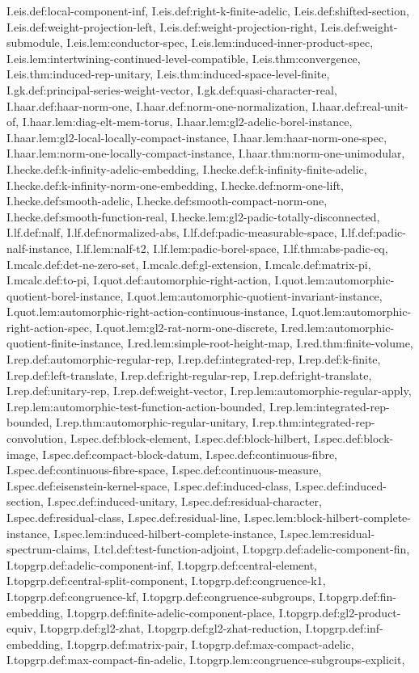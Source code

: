 \begin{theorem}
I.eis.def:local-component-inf, I.eis.def:right-k-finite-adelic, I.eis.def:shifted-section, I.eis.def:weight-projection-left, I.eis.def:weight-projection-right, I.eis.def:weight-submodule, I.eis.lem:conductor-spec, I.eis.lem:induced-inner-product-spec, I.eis.lem:intertwining-continued-level-compatible, I.eis.thm:convergence, I.eis.thm:induced-rep-unitary, I.eis.thm:induced-space-level-finite, I.gk.def:principal-series-weight-vector, I.gk.def:quasi-character-real, I.haar.def:haar-norm-one, I.haar.def:norm-one-normalization, I.haar.def:real-unit-of, I.haar.lem:diag-elt-mem-torus, I.haar.lem:gl2-adelic-borel-instance, I.haar.lem:gl2-local-locally-compact-instance, I.haar.lem:haar-norm-one-spec, I.haar.lem:norm-one-locally-compact-instance, I.haar.thm:norm-one-unimodular, I.hecke.def:k-infinity-adelic-embedding, I.hecke.def:k-infinity-finite-adelic, I.hecke.def:k-infinity-norm-one-embedding, I.hecke.def:norm-one-lift, I.hecke.def:smooth-adelic, I.hecke.def:smooth-compact-norm-one, I.hecke.def:smooth-function-real, I.hecke.lem:gl2-padic-totally-disconnected, I.lf.def:nalf, I.lf.def:normalized-abs, I.lf.def:padic-measurable-space, I.lf.def:padic-nalf-instance, I.lf.lem:nalf-t2, I.lf.lem:padic-borel-space, I.lf.thm:abs-padic-eq, I.mcalc.def:det-ne-zero-set, I.mcalc.def:gl-extension, I.mcalc.def:matrix-pi, I.mcalc.def:to-pi, I.quot.def:automorphic-right-action, I.quot.lem:automorphic-quotient-borel-instance, I.quot.lem:automorphic-quotient-invariant-instance, I.quot.lem:automorphic-right-action-continuous-instance, I.quot.lem:automorphic-right-action-spec, I.quot.lem:gl2-rat-norm-one-discrete, I.red.lem:automorphic-quotient-finite-instance, I.red.lem:simple-root-height-map, I.red.thm:finite-volume, I.rep.def:automorphic-regular-rep, I.rep.def:integrated-rep, I.rep.def:k-finite, I.rep.def:left-translate, I.rep.def:right-regular-rep, I.rep.def:right-translate, I.rep.def:unitary-rep, I.rep.def:weight-vector, I.rep.lem:automorphic-regular-apply, I.rep.lem:automorphic-test-function-action-bounded, I.rep.lem:integrated-rep-bounded, I.rep.thm:automorphic-regular-unitary, I.rep.thm:integrated-rep-convolution, I.spec.def:block-element, I.spec.def:block-hilbert, I.spec.def:block-image, I.spec.def:compact-block-datum, I.spec.def:continuous-fibre, I.spec.def:continuous-fibre-space, I.spec.def:continuous-measure, I.spec.def:eisenstein-kernel-space, I.spec.def:induced-class, I.spec.def:induced-section, I.spec.def:induced-unitary, I.spec.def:residual-character, I.spec.def:residual-class, I.spec.def:residual-line, I.spec.lem:block-hilbert-complete-instance, I.spec.lem:induced-hilbert-complete-instance, I.spec.lem:residual-spectrum-claims, I.tcl.def:test-function-adjoint, I.topgrp.def:adelic-component-fin, I.topgrp.def:adelic-component-inf, I.topgrp.def:central-element, I.topgrp.def:central-split-component, I.topgrp.def:congruence-k1, I.topgrp.def:congruence-kf, I.topgrp.def:congruence-subgroups, I.topgrp.def:fin-embedding, I.topgrp.def:finite-adelic-component-place, I.topgrp.def:gl2-product-equiv, I.topgrp.def:gl2-zhat, I.topgrp.def:gl2-zhat-reduction, I.topgrp.def:inf-embedding, I.topgrp.def:matrix-pair, I.topgrp.def:max-compact-adelic, I.topgrp.def:max-compact-fin-adelic, I.topgrp.lem:congruence-subgroups-explicit, 
\end{theorem}
